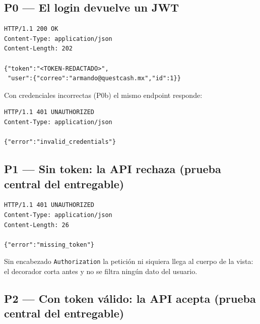 \documentclass[11pt,letterpaper]{article}
\begin{document}
\subsection{P0 — El login devuelve un JWT}

\begin{consola}[title={\$ curl -i -X POST /api/v1/auth/login -d '\{"correo":"...","password":"..."\}'}]
\begin{lstlisting}[style=terminal]
HTTP/1.1 200 OK
Content-Type: application/json
Content-Length: 202

{"token":"<TOKEN-REDACTADO>",
 "user":{"correo":"armando@questcash.mx","id":1}}
\end{lstlisting}
\end{consola}

\noindent Con credenciales incorrectas (P0b) el mismo endpoint responde:

\begin{consola}[title={\$ curl -i -X POST /api/v1/auth/login -d '\{"correo":"...","password":"incorrecta"\}'}]
\begin{lstlisting}[style=terminal]
HTTP/1.1 401 UNAUTHORIZED
Content-Type: application/json

{"error":"invalid_credentials"}
\end{lstlisting}
\end{consola}

\subsection{P1 — Sin token: la API rechaza \textnormal{(prueba central del entregable)}}

\begin{consola}[title={\$ curl -i http://127.0.0.1:5001/api/v1/auth/me}]
\begin{lstlisting}[style=terminal]
HTTP/1.1 401 UNAUTHORIZED
Content-Type: application/json
Content-Length: 26

{"error":"missing_token"}
\end{lstlisting}
\end{consola}

\noindent Sin encabezado \texttt{Authorization} la petición ni siquiera llega al cuerpo de la
vista: el decorador corta antes y no se filtra ningún dato del usuario.

\subsection{P2 — Con token válido: la API acepta \textnormal{(prueba central del entregable)}}
\end{document}
